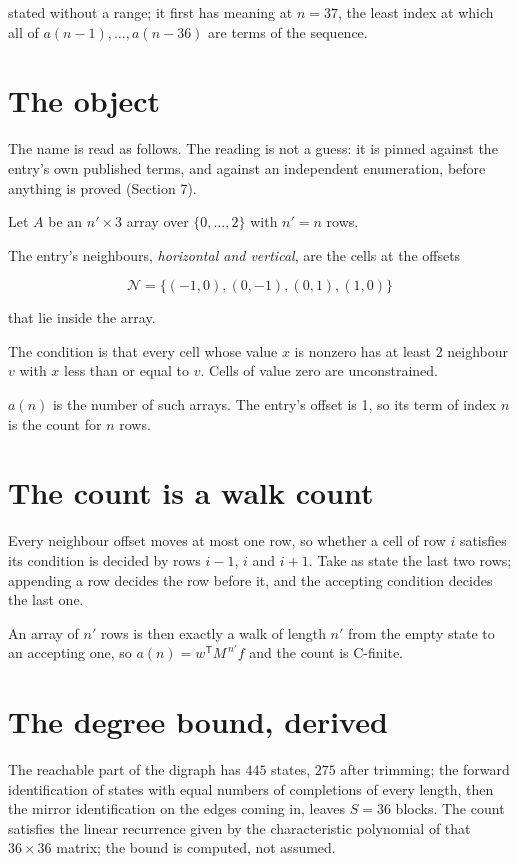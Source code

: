 \documentclass[11pt]{article}
\theoremstyle{definition}
\begin{document}
stated without a range; it first has meaning at $n = 37$, the least index at which all of $a(n-1),\dots,a(n-36)$ are terms of the sequence.

\section{The object}

The name is read as follows. The reading is not a guess: it is pinned against the entry's own published terms, and against an independent enumeration, before anything is proved (Section 7).

Let $A$ be an $n' \times 3$ array over $\{0,\dots,2\}$ with $n' = n$ rows.

The entry's neighbours, {\itshape horizontal and vertical}, are the cells at the offsets

\[\mathcal{N} = \{(-1,0), (0,-1), (0,1), (1,0)\}\]

that lie inside the array.

The condition is that every cell whose value $x$ is nonzero has at least 2 neighbour $v$ with $x$ less than or equal to $v$. Cells of value zero are unconstrained.

$a(n)$ is the number of such arrays. The entry's offset is 1, so its term of index $n$ is the count for $n$ rows.

\section{The count is a walk count}

Every neighbour offset moves at most one row, so whether a cell of row $i$ satisfies its condition is decided by rows $i-1$, $i$ and $i+1$. Take as state the last two rows; appending a row decides the row before it, and the accepting condition decides the last one.

An array of $n'$ rows is then exactly a walk of length $n'$ from the empty state to an accepting one, so $a(n) = w^{\mathsf T}M^{\,n'}f$ and the count is C-finite.

\section{The degree bound, derived}

The reachable part of the digraph has $445$ states, $275$ after trimming; the forward identification of states with equal numbers of completions of every length, then the mirror identification on the edges coming in, leaves $S = 36$ blocks. The count satisfies the linear recurrence given by the characteristic polynomial of that $36\times36$ matrix; the bound is computed, not assumed.
\end{document}
